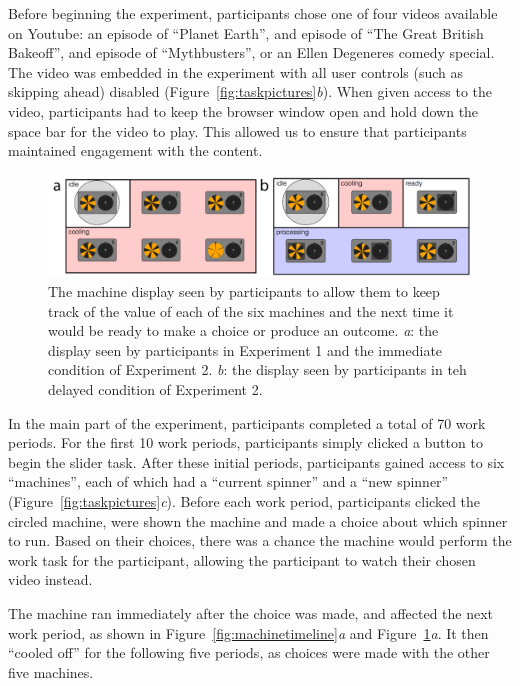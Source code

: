 \documentclass[10pt,letterpaper]{article}
\begin{document}
Before beginning the experiment, participants chose one of four videos available
on Youtube: an episode of ``Planet Earth'', and episode of ``The Great British
Bakeoff'', and episode of ``Mythbusters'', or an Ellen Degeneres comedy special.
The video was embedded in the experiment with all user controls (such as
skipping ahead) disabled (Figure~\ref{fig:taskpictures}\emph{b}). When given access to the video, participants had to keep the
browser window open and hold down the space bar for the video to play. This allowed us to ensure that
participants maintained engagement with the content.

\begin{figure}
\centering
\includegraphics[width=\textwidth]{figures/machinemappictures.png}
\caption{The machine display seen by participants to allow them to keep track of
  the value of each of the six machines and the next time it would be ready to
  make a choice or produce an outcome. \emph{a}: the display seen by
  participants in Experiment 1 and the immediate condition of Experiment 2.
  \emph{b}: the display seen by participants in teh delayed condition of
  Experiment 2.}
\label{fig:machinemappictures}
\end{figure}

In the main part of the experiment, participants completed a total of 70 work
periods. For the first 10 work periods, participants simply clicked a button to begin the
slider task. After these initial periods, participants gained access to six
``machines'', each of which had a ``current spinner'' and a ``new spinner'' (Figure~\ref{fig:taskpictures}\emph{c}).
Before each work period, participants clicked the circled machine,
were shown the machine and made a choice about which spinner to run. Based on their choices, there was a
chance the machine would perform the work task for the participant, allowing the
participant to watch their chosen video instead.

The machine ran immediately after the choice was
made, and affected the next work period, as shown in
Figure~\ref{fig:machinetimeline}\emph{a} and Figure~\ref{fig:machinemappictures}\emph{a}. It then ``cooled off'' for the
following five periods, as choices were made with the other five machines.
\end{document}
